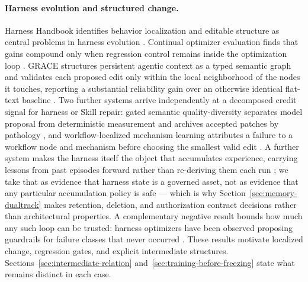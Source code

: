 \paragraph{Harness evolution and structured change.}
Harness Handbook identifies behavior localization and editable structure as central problems in harness evolution \cite{wang2026handbook}. Continual optimizer evaluation finds that gains compound only when regression control remains inside the optimization loop \cite{wang2026compound}. GRACE structures persistent agentic context as a typed semantic graph and validates each proposed edit only within the local neighborhood of the nodes it touches, reporting a substantial reliability gain over an otherwise identical flat-text baseline \cite{hsu2026grace}. Two further systems arrive independently at a decomposed credit signal for harness or Skill repair: gated semantic quality-diversity separates model proposal from deterministic measurement and archives accepted patches by pathology \cite{luo2026gsme}, and workflow-localized mechanism learning attributes a failure to a workflow node and mechanism before choosing the smallest valid edit \cite{lin2026wml}. A further system makes the harness itself the object that accumulates experience, carrying lessons from past episodes forward rather than re-deriving them each run \cite{huang2026memoharness}; we take that as evidence that harness state is a governed asset, not as evidence that any particular accumulation policy is safe --- which is why Section~\ref{sec:memory-dualtrack} makes retention, deletion, and authorization contract decisions rather than architectural properties. A complementary negative result bounds how much any such loop can be trusted: harness optimizers have been observed proposing guardrails for failure classes that never occurred \cite{wang2026phantom}. These results motivate localized change, regression gates, and explicit intermediate structures. Sections~\ref{sec:intermediate-relation} and~\ref{sec:training-before-freezing} state what remains distinct in each case.

